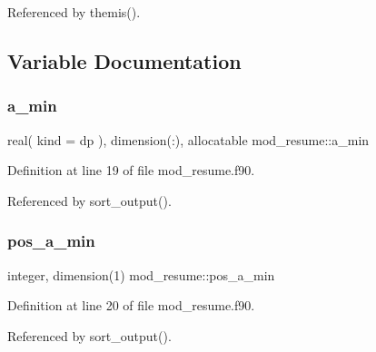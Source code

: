 Referenced by themis().



\subsection{Variable Documentation}
\mbox{\label{namespacemod__resume_ad3cf0f0162ccc00d0efebb0348fe6ae5}} 
\subsubsection{\texorpdfstring{a\+\_\+min}{a\_min}}
{\footnotesize\ttfamily real( kind = dp ), dimension(\+:), allocatable mod\+\_\+resume\+::a\+\_\+min}



Definition at line 19 of file mod\+\_\+resume.\+f90.



Referenced by sort\+\_\+output().

\mbox{\label{namespacemod__resume_a2861e2f353be05850b4ad384446859c6}} 
\subsubsection{\texorpdfstring{pos\+\_\+a\+\_\+min}{pos\_a\_min}}
{\footnotesize\ttfamily integer, dimension(1) mod\+\_\+resume\+::pos\+\_\+a\+\_\+min}



Definition at line 20 of file mod\+\_\+resume.\+f90.



Referenced by sort\+\_\+output().

